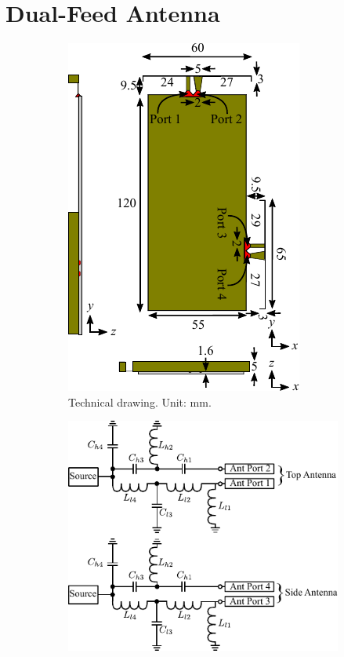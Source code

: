 \section{Dual-Feed Antenna}
\label{sec:tech_sol_ant3}
\begin{figure}[htbp]
    \begin{subfigure}[b]{0.49\linewidth}
        \centering
        \includegraphics{img/tech_sol/nonresonant/technical}
        \caption{Technical drawing. Unit: mm.}
        \label{fig:ant3technical}
    \end{subfigure}
    \hfill
    \begin{subfigure}[b]{0.49\linewidth}
        \centering
        \includegraphics{img/tech_sol/nonresonant/schematic_tuning}\\[0cm]

\end{subfigure}
\end{figure}
